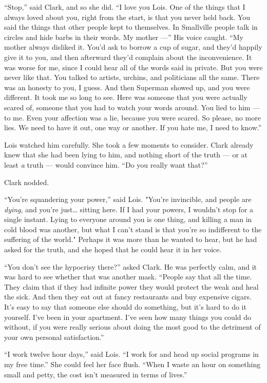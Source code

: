 ``Stop,'' said Clark, and so she did. ``I love you Lois. One of the
things that I always loved about you, right from the start, is that you
never held back. You said the things that other people kept to
themselves. In Smallville people talk in circles and hide barbs in their
words. My mother ---'' His voice caught. ``My mother always disliked it.
You'd ask to borrow a cup of sugar, and they'd happily give it to you,
and then afterward they'd complain about the inconvenience. It was worse
for me, since I could hear all of the words said in private. But you
were never like that. You talked to artists, urchins, and politicians
all the same. There was an honesty to you, I guess. And then Superman
showed up, and you were different. It took me so long to see. Here was
someone that you were actually scared of, someone that you had to watch
your words around. You lied to him --- to me. Even your affection was a
lie, because you were scared. So please, no more lies. We need to have
it out, one way or another. If you hate me, I need to know.''

Lois watched him carefully. She took a few moments to consider. Clark
already knew that she had been lying to him, and nothing short of the
truth --- or at least \emph{a} truth --- would convince him. ``Do you
really want that?''

Clark nodded.

``You're squandering your power,'' said Lois. "You're invincible, and
people are \emph{dying}, and you're just\ldots{} sitting here. If I had
your powers, I wouldn't stop for a single instant. Lying to everyone
around you is one thing, and killing a man in cold blood was another,
but what I can't stand is that you're so indifferent to the suffering of
the world." Perhaps it was more than he wanted to hear, but he had asked
for the truth, and she hoped that he could hear it in her voice.

``You don't see the hypocrisy there?'' asked Clark. He was perfectly
calm, and it was hard to see whether that was another mask. ``People say
that all the time. They claim that if they had infinite power they would
protect the weak and heal the sick. And then they eat out at fancy
restaurants and buy expensive cigars. It's easy to say that someone else
should do something, but it's hard to do it yourself. I've been in your
apartment. I've seen how many things you could do without, if you were
really serious about doing the most good to the detriment of your own
personal satisfaction.''

``I work twelve hour days,'' said Lois. ``I work for and head up social
programs in my free time.'' She could feel her face flush. ``When I
waste an hour on something small and petty, the cost isn't measured in
terms of lives.''

